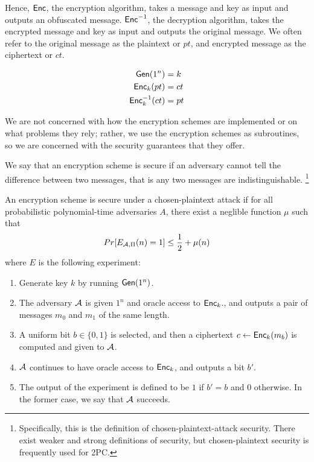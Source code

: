 Hence, $\textsf{Enc}$, the encryption algorithm, takes a message and key as input and outputs an obfuscated message. 
$\textsf{Enc}^{-1}$, the decryption algorithm, takes the encrypted message and key as input and outputs the original message. 
We often refer to the original message as the plaintext or $pt$, and encrypted message as the ciphertext or $ct$. 

\begin{equation}
    \label{eqn:encryption}
    \begin{split}
    	\textsf{Gen}(1^n) & = k \\
        \textsf{Enc}_k (pt) & = ct  \\
        \textsf{Enc}^{-1}_k(ct) & = pt
    \end{split}
\end{equation}

We are not concerned with how the encryption schemes are implemented or on what problems they rely; rather, we use the encryption schemes as subroutines, so we are concerned with the security guarantees that they offer.

We say that an encryption scheme is secure if an adversary cannot tell the difference between two messages, that is any two messages are indistinguishable. 
\footnote{Specifically, this is the definition of chosen-plaintext-attack security. There exist weaker and strong definitions of security, but chosen-plaintext security is frequently used for 2PC.}

\begin{definition}
An encryption scheme is secure under a chosen-plaintext attack if for all probabilistic polynomial-time adversaries $A$, there exist a neglible function $\mu$ such that
\begin{equation}
Pr[E_{\mathcal{A}, \Pi}(n) = 1] \leq \frac{1}{2} + \mu(n)
\end{equation}
where $E$ is the following experiment:
\begin{enumerate}
\item Generate key $k$ by running $\textsf{Gen}(1^n)$. 
\item The adversary $\mathcal{A}$ is given $1^n$ and oracle access to $\textsf{Enc}_k$., and outputs a pair of messages $m_0$ and $m_1$ of the same length.
\item A uniform bit $b \in \{0,1\}$ is selected, and then a ciphertext $c \gets \textsf{Enc}_k(m_b)$ is computed and given to $\mathcal{A}$.  
\item $\mathcal{A}$ continues to have oracle access to $\textsf{Enc}_k$, and outputs a bit $b'$. 
\item The output of the experiment is defined to be $1$ if $b' = b$ and $0$ otherwise. In the former case, we say that $\mathcal{A}$ succeeds.
\end{enumerate}
\end{definition}

